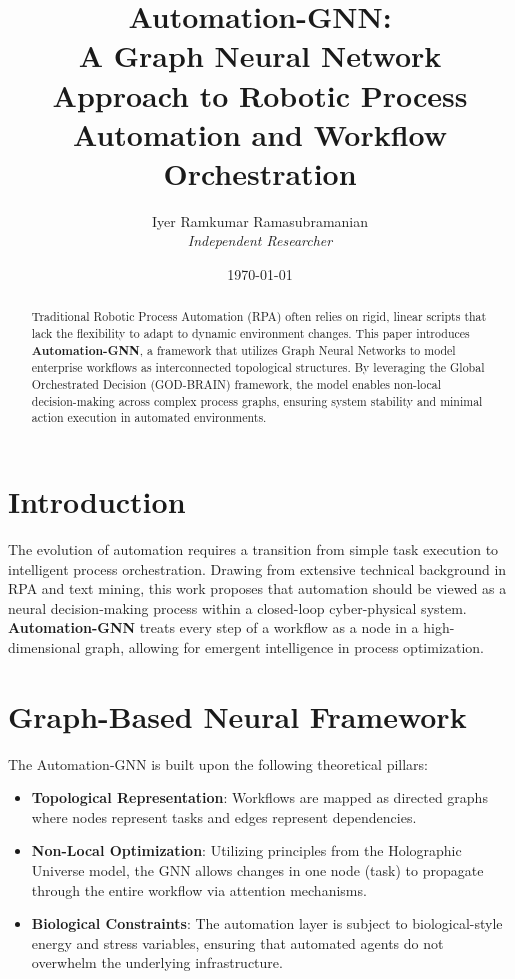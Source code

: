 \documentclass[12pt]{article}
\title{\textbf{Automation-GNN: \\ A Graph Neural Network Approach to Robotic Process Automation and Workflow Orchestration}}
\author{Iyer Ramkumar Ramasubramanian \\ \textit{Independent Researcher}}
\date{\today}
\begin{document}
\maketitle

\begin{abstract}
Traditional Robotic Process Automation (RPA) often relies on rigid, linear scripts that lack the flexibility to adapt to dynamic environment changes. This paper introduces \textbf{Automation-GNN}, a framework that utilizes Graph Neural Networks to model enterprise workflows as interconnected topological structures. By leveraging the Global Orchestrated Decision (GOD-BRAIN) framework, the model enables non-local decision-making across complex process graphs, ensuring system stability and minimal action execution in automated environments.
\end{abstract}

\section{Introduction}
The evolution of automation requires a transition from simple task execution to intelligent process orchestration. Drawing from extensive technical background in RPA and text mining, this work proposes that automation should be viewed as a neural decision-making process within a closed-loop cyber-physical system. \textbf{Automation-GNN} treats every step of a workflow as a node in a high-dimensional graph, allowing for emergent intelligence in process optimization.

\section{Graph-Based Neural Framework}

The Automation-GNN is built upon the following theoretical pillars:

\begin{itemize}
\item \textbf{Topological Representation}: Workflows are mapped as directed graphs where nodes represent tasks and edges represent dependencies.
\item \textbf{Non-Local Optimization}: Utilizing principles from the Holographic Universe model, the GNN allows changes in one node (task) to propagate through the entire workflow via attention mechanisms.
\item \textbf{Biological Constraints}: The automation layer is subject to biological-style energy and stress variables, ensuring that automated agents do not overwhelm the underlying infrastructure.
\end{itemize}
\end{document}
